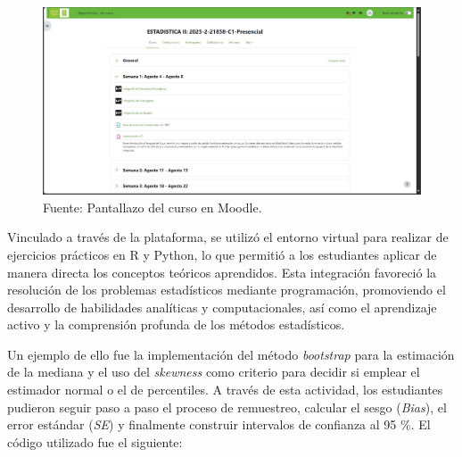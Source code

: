 \documentclass[letter,oneside,12pt,spanish]{report}
\begin{document}
\begin{figure}[ht]
	\centering
	\includegraphics[width=1\textwidth]{Figs/Moodle.pdf}
	\label{fig:Moodle}
	\\Fuente: Pantallazo del curso en Moodle.
\end{figure}

\newpage

Vinculado a través de la plataforma, se utilizó el entorno virtual para realizar de ejercicios prácticos en R y Python, lo que permitió a los estudiantes aplicar de manera directa los conceptos teóricos aprendidos. Esta integración favoreció la resolución de los problemas estadísticos mediante programación, promoviendo el desarrollo de habilidades analíticas y computacionales, así como el aprendizaje activo y la comprensión profunda de los métodos estadísticos.

Un ejemplo de ello fue la implementación del método \textit{bootstrap} para la estimación de la mediana y el uso del \textit{skewness} como criterio para decidir si emplear el estimador normal o el de percentiles. A través de esta actividad, los estudiantes pudieron seguir paso a paso el proceso de remuestreo, calcular el sesgo (\textit{Bias}), el error estándar (\textit{SE}) y finalmente construir intervalos de confianza al 95 \%. El código utilizado fue el siguiente:
\end{document}

